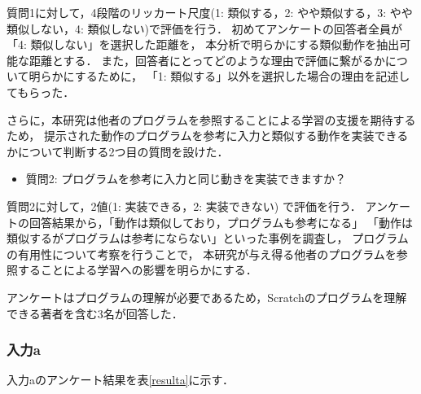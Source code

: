 \documentclass[11pt]{jreport}
\begin{document}
質問1に対して，4段階のリッカート尺度(1: 類似する，2: やや類似する，3: やや類似しない，4: 類似しない)で評価を行う．
初めてアンケートの回答者全員が「4: 類似しない」を選択した距離を，
本分析で明らかにする類似動作を抽出可能な距離とする．
また，回答者にとってどのような理由で評価に繋がるかについて明らかにするために，
「1: 類似する」以外を選択した場合の理由を記述してもらった．

さらに，本研究は他者のプログラムを参照することによる学習の支援を期待するため，
提示された動作のプログラムを参考に入力と類似する動作を実装できるかについて判断する2つ目の質問を設けた．

\begin{itemize}
    \item 質問2: プログラムを参考に入力と同じ動きを実装できますか？
\end{itemize}

質問2に対して，2値(1: 実装できる，2: 実装できない) で評価を行う．
アンケートの回答結果から，「動作は類似しており，プログラムも参考になる」
「動作は類似するがプログラムは参考にならない」といった事例を調査し，
プログラムの有用性について考察を行うことで，
本研究が与え得る他者のプログラムを参照することによる学習への影響を明らかにする．

アンケートはプログラムの理解が必要であるため，Scratchのプログラムを理解できる著者を含む3名が回答した．

\subsubsection{入力a}
入力aのアンケート結果を表\ref{resulta}に示す．
\end{document}

